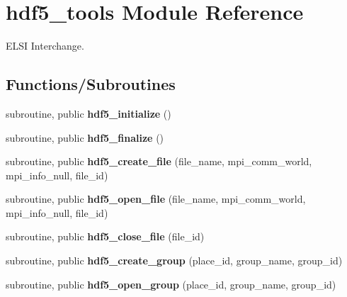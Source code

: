 \hypertarget{namespacehdf5__tools}{}\section{hdf5\+\_\+tools Module Reference}
\label{namespacehdf5__tools}


E\+L\+S\+I Interchange.  


\subsection*{Functions/\+Subroutines}
\begin{DoxyCompactItemize}
\item 
\hypertarget{namespacehdf5__tools_a0774bb98cb3cb3c0ed7497a606e76541}{}subroutine, public {\bfseries hdf5\+\_\+initialize} ()\label{namespacehdf5__tools_a0774bb98cb3cb3c0ed7497a606e76541}

\item 
\hypertarget{namespacehdf5__tools_a4eb01cf583616c455828486c208cba3d}{}subroutine, public {\bfseries hdf5\+\_\+finalize} ()\label{namespacehdf5__tools_a4eb01cf583616c455828486c208cba3d}

\item 
\hypertarget{namespacehdf5__tools_a9f4ed037eedb64669d8f146a6cd52bf8}{}subroutine, public {\bfseries hdf5\+\_\+create\+\_\+file} (file\+\_\+name, mpi\+\_\+comm\+\_\+world, mpi\+\_\+info\+\_\+null, file\+\_\+id)\label{namespacehdf5__tools_a9f4ed037eedb64669d8f146a6cd52bf8}

\item 
\hypertarget{namespacehdf5__tools_a2f4502f954d7d48b385113de2c4a3ee2}{}subroutine, public {\bfseries hdf5\+\_\+open\+\_\+file} (file\+\_\+name, mpi\+\_\+comm\+\_\+world, mpi\+\_\+info\+\_\+null, file\+\_\+id)\label{namespacehdf5__tools_a2f4502f954d7d48b385113de2c4a3ee2}

\item 
\hypertarget{namespacehdf5__tools_aaf4e4c8406efe3ed249209d9e6b39126}{}subroutine, public {\bfseries hdf5\+\_\+close\+\_\+file} (file\+\_\+id)\label{namespacehdf5__tools_aaf4e4c8406efe3ed249209d9e6b39126}

\item 
\hypertarget{namespacehdf5__tools_ad7df92796ca49e54076d4c8cfaa5e1c8}{}subroutine, public {\bfseries hdf5\+\_\+create\+\_\+group} (place\+\_\+id, group\+\_\+name, group\+\_\+id)\label{namespacehdf5__tools_ad7df92796ca49e54076d4c8cfaa5e1c8}

\item 
\hypertarget{namespacehdf5__tools_a57a6e9277bbef78fd0cd86786b2c4371}{}subroutine, public {\bfseries hdf5\+\_\+open\+\_\+group} (place\+\_\+id, group\+\_\+name, group\+\_\+id)\label{namespacehdf5__tools_a57a6e9277bbef78fd0cd86786b2c4371}


\end{DoxyCompactItemize}

